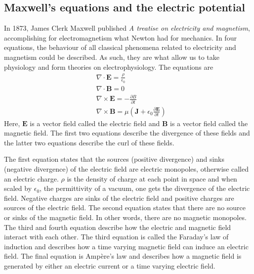 \subsection{Maxwell's equations and the electric potential}
In 1873, James Clerk Maxwell published \textit{A treatise on electricity and magnetism}, accomplishing for electromagnetism what Newton had for mechanics. In four equations, the behaviour of all classical phenomena related to electricity and magnetism could be described. As such, they are what allow us to take physiology and form theories on electrophysiology. The equations are
\begin{align*}
    & \nabla \cdot \bm{E} = \frac{\rho}{\epsilon_0} \\
    & \nabla \cdot \bm{B} = 0 \\
    & \nabla \times \bm{E} = - \frac{\partial {B}}{\partial t} \\
    & \nabla \times \bm{B} = \mu \left( \bm{J} + \epsilon_0 \frac{\partial \bm{E}}{\partial t} \right)
\end{align*}
Here, $\bm{E}$ is a vector field called the electric field and $\bm{B}$ is a vector field called the magnetic field. The first two equations describe the divergence of these fields and the latter two equations describe the curl of these fields. 

The first equation states that the sources (positive divergence) and sinks (negative divergence) of the electric field are electric monopoles, otherwise called an electric charge. $\rho$ is the density of charge at each point in space and when scaled by $\epsilon_0$, the permittivity of a vacuum, one gets the divergence of the electric field. Negative charges are sinks of the electric field and positive charges are sources of the electric field. The second equation states that there are no source or sinks of the magnetic field. In other words, there are no magnetic monopoles. The third and fourth equation describe how the electric and magnetic field interact with each other. The third equation is called the Faraday's law of induction and describes how a time varying magnetic field can induce an electric field. The final equation is Ampère's law and describes how a magnetic field is generated by either an electric current or a time varying electric field.

